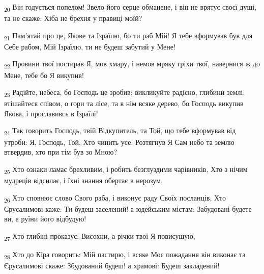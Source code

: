 \begin{tcolorbox}
\textsubscript{20} Він годується попелом! Звело його серце обманене, і він не врятує своєї душі, та не скаже: Хіба не брехня у правиці моїй?
\end{tcolorbox}
\begin{tcolorbox}
\textsubscript{21} Пам'ятай про це, Якове та Ізраїлю, бо ти раб Мій! Я тебе вформував був для Себе рабом, Мій Ізраїлю, ти не будеш забутий у Мене!
\end{tcolorbox}
\begin{tcolorbox}
\textsubscript{22} Провини твої постирав Я, мов хмару, і немов мряку гріхи твої, навернися ж до Мене, тебе бо Я викупив!
\end{tcolorbox}
\begin{tcolorbox}
\textsubscript{23} Радійте, небеса, бо Господь це зробив; викликуйте радісно, глибини землі; втішайтеся співом, о гори та лісе, та в нім всяке дерево, бо Господь викупив Якова, і прославивсь в Ізраїлі!
\end{tcolorbox}
\begin{tcolorbox}
\textsubscript{24} Так говорить Господь, твій Відкупитель, та Той, що тебе вформував від утроби: Я, Господь, Той, Хто чинить усе: Розтягнув Я Сам небо та землю втвердив, хто при тім був зо Мною?
\end{tcolorbox}
\begin{tcolorbox}
\textsubscript{25} Хто ознаки ламає брехливим, і робить безглуздими чарівників, Хто з нічим мудреців відсилає, і їхні знання обертає в нерозум,
\end{tcolorbox}
\begin{tcolorbox}
\textsubscript{26} Хто сповнює слово Свого раба, і виконує раду Своїх посланців, Хто Єрусалимові каже: Ти будеш заселений! а юдейським містам: Забудовані будете ви, а руїни його відбудую!
\end{tcolorbox}
\begin{tcolorbox}
\textsubscript{27} Хто глибіні проказує: Висохни, а річки твої Я повисушую,
\end{tcolorbox}
\begin{tcolorbox}
\textsubscript{28} Хто до Кіра говорить: Мій пастирю, і всяке Моє пожадання він виконає та Єрусалимові скаже: Збудований будеш! а храмові: Будеш закладений!
\end{tcolorbox}
